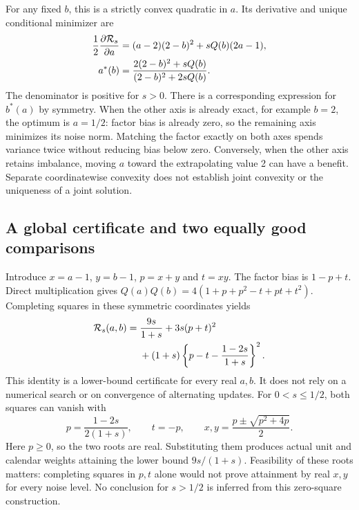 For any fixed $b$, this is a strictly convex quadratic in $a$. Its derivative
and unique conditional minimizer are
\begin{align}
 \frac{1}{2}\frac{\partial{\cal R}_s}{\partial a}
  &=(a-2)(2-b)^2+sQ(b)(2a-1),\nonumber\\
 a^*(b)&=\frac{2(2-b)^2+sQ(b)}{(2-b)^2+2sQ(b)}.
 \label{exec17:s6-joint-conditional}
\end{align}
The denominator is positive for $s>0$. There is a corresponding expression
for $b^*(a)$ by symmetry. When the other axis is already exact, for example
$b=2$, the optimum is $a=1/2$: factor bias is already zero, so the remaining
axis minimizes its noise norm. Matching the factor exactly on both axes
spends variance twice without reducing bias below zero. Conversely, when
the other axis retains imbalance, moving $a$ toward the extrapolating value
2 can have a benefit. Separate coordinatewise convexity does not establish
joint convexity or the uniqueness of a joint solution.

\subsection{A global certificate and two equally good comparisons}

Introduce $x=a-1$, $y=b-1$, $p=x+y$ and $t=xy$. The factor bias is
$1-p+t$. Direct multiplication gives
$Q(a)Q(b)=4(1+p+p^2-t+pt+t^2)$. Completing squares in these symmetric
coordinates yields
\begin{equation}
 \begin{split}
 {\cal R}_s(a,b)
  ={}&\frac{9s}{1+s}+3s(p+t)^2\\
     &+(1+s)\left\{p-t-\frac{1-2s}{1+s}\right\}^2.
 \end{split}
 \label{exec17:s6-joint-certificate}
\end{equation}
This identity is a lower-bound certificate for every real $a,b$. It does
not rely on a numerical search or on convergence of alternating updates.
For $0<s\leq1/2$, both squares can vanish with
\begin{equation}
 p=\frac{1-2s}{2(1+s)},\qquad t=-p,\qquad
 x,y=\frac{p\mathbin{\pm}\sqrt{p^2+4p}}{2}.
 \label{exec17:s6-joint-global}
\end{equation}
Here $p\geq0$, so the two roots are real. Substituting them produces actual
unit and calendar weights attaining the lower bound $9s/(1+s)$. Feasibility
of these roots matters: completing squares in $p,t$ alone would not prove
attainment by real $x,y$ for every noise level. No conclusion for $s>1/2$
is inferred from this zero-square construction.

